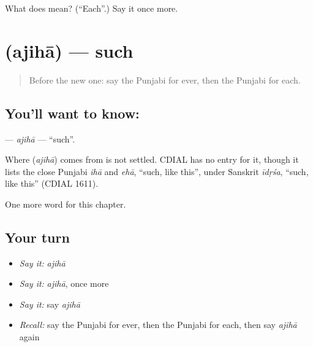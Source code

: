 \begin{tcolorbox}[breakable,colback=teal!4,colframe=teal!35!black,title={Before you move on}]
What does  mean? (\textquotedblleft{}Each\textquotedblright{}.) Say it once more.
\end{tcolorbox}
\section[\texorpdfstring{\pa{ਅਜਿਹਾ} (ajihā)}{ਅਜਿਹਾ (ajihā)}]{ (ajihā) — such}

\label{lesson:PA-C106-ajiha}



\begin{quote}
Before the new one: say the Punjabi for ever, then the Punjabi for each.
\end{quote}

\subsection*{You'll want to know: }
\textbf{} — \emph{ajihā} — \textquotedblleft{}such\textquotedblright{}.

\begin{cousinweb}
Where \textbf{} (\emph{ajihā}) comes from is not settled. CDIAL has no entry for it, though it lists the close Punjabi \emph{ihā} and \emph{ehā}, \textquotedblleft{}such, like this\textquotedblright{}, under Sanskrit \emph{īdṛśa}, \textquotedblleft{}such, like this\textquotedblright{} (CDIAL 1611).
\end{cousinweb}

\begin{grammarlens}[title={What you've built}]
One more word for this chapter.
\end{grammarlens}

\subsection*{Your turn}
\begin{itemize}
\raggedright
  \item \emph{Say it:} \emph{ajihā}
  \item \emph{Say it:} \emph{ajihā}, once more
  \item \emph{Say it:} say \emph{ajihā}
  \item \emph{Recall:} say the Punjabi for ever, then the Punjabi for each, then say \emph{ajihā} again
\end{itemize}

